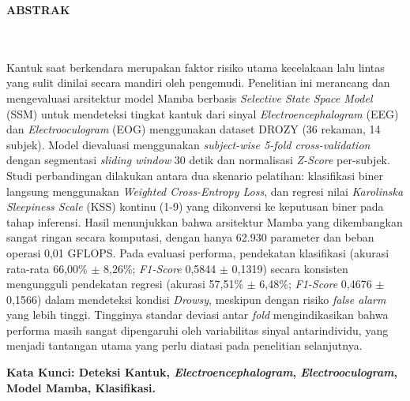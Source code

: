 \clearpage
{}%
\thispagestyle{fancy}

\begin{center}
	\large \bfseries \MakeUppercase{Abstrak}\\
	\normalsize \normalfont {\thetitle}\\
	\normalsize \normalfont {\theauthor}\\
	\bigskip
	
	\normalsize \normalfont \justifying \singlespacing
	Kantuk saat berkendara merupakan faktor risiko utama kecelakaan lalu lintas yang sulit dinilai secara mandiri oleh pengemudi. Penelitian ini merancang dan mengevaluasi arsitektur model Mamba berbasis \textit{Selective State Space Model} (SSM) untuk mendeteksi tingkat kantuk dari sinyal \textit{Electroencephalogram} (EEG) dan \textit{Electrooculogram} (EOG) menggunakan dataset DROZY (36 rekaman, 14 subjek). Model dievaluasi menggunakan \textit{subject-wise 5-fold cross-validation} dengan segmentasi \textit{sliding window} 30 detik dan normalisasi \textit{Z-Score} per-subjek. Studi perbandingan dilakukan antara dua skenario pelatihan: klasifikasi biner langsung menggunakan \textit{Weighted Cross-Entropy Loss}, dan regresi nilai \textit{Karolinska Sleepiness Scale} (KSS) kontinu (1-9) yang dikonversi ke keputusan biner pada tahap inferensi. Hasil menunjukkan bahwa arsitektur Mamba yang dikembangkan sangat ringan secara komputasi, dengan hanya 62.930 parameter dan beban operasi 0,01 GFLOPS. Pada evaluasi performa, pendekatan klasifikasi (akurasi rata-rata 66,00\% $\pm$ 8,26\%; \textit{F1-Score} 0,5844 $\pm$ 0,1319) secara konsisten mengungguli pendekatan regresi (akurasi 57,51\% $\pm$ 6,48\%; \textit{F1-Score} 0,4676 $\pm$ 0,1566) dalam mendeteksi kondisi \textit{Drowsy}, meskipun dengan risiko \textit{false alarm} yang lebih tinggi. Tingginya standar deviasi antar \textit{fold} mengindikasikan bahwa performa masih sangat dipengaruhi oleh variabilitas sinyal antarindividu, yang menjadi tantangan utama yang perlu diatasi pada penelitian selanjutnya.
	\par

    \vspace{20pt}
	\raggedright \textbf{Kata Kunci: Deteksi Kantuk, \textit{Electroencephalogram}, \textit{Electrooculogram}, Model Mamba, Klasifikasi.}
	
	\vfill
	
\end{center}
\clearpage